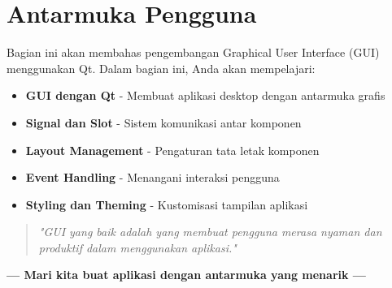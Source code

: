 \section*{Antarmuka Pengguna}

Bagian ini akan membahas pengembangan Graphical User Interface (GUI) menggunakan Qt. Dalam bagian ini, Anda akan mempelajari:

\begin{itemize}
\item \textbf{GUI dengan Qt} - Membuat aplikasi desktop dengan antarmuka grafis
\item \textbf{Signal dan Slot} - Sistem komunikasi antar komponen
\item \textbf{Layout Management} - Pengaturan tata letak komponen
\item \textbf{Event Handling} - Menangani interaksi pengguna
\item \textbf{Styling dan Theming} - Kustomisasi tampilan aplikasi
\end{itemize}

\begin{quote}
\textit{"GUI yang baik adalah yang membuat pengguna merasa nyaman dan produktif dalam menggunakan aplikasi."}
\end{quote}

\vspace{1cm}

\begin{center}
\textbf{--- Mari kita buat aplikasi dengan antarmuka yang menarik ---}
\end{center} 